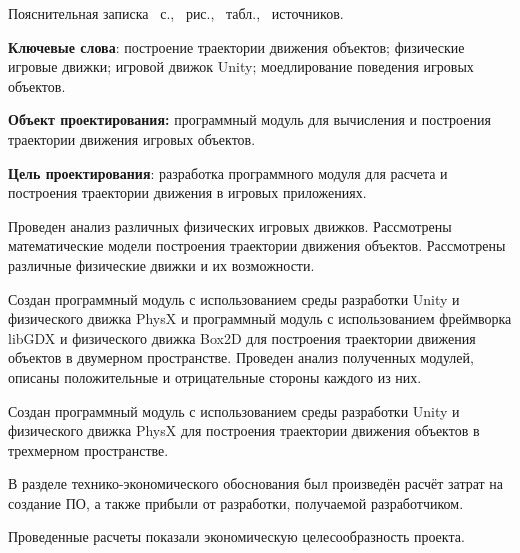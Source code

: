 \thispagestyle{empty}

\begin{center}
Пояснительная записка \pageref*{LastPage}~с., \totfig{}~рис., \tottab{}~табл., \totref{}~источников.
\diplomabig	
\end{center}

\textbf{Ключевые слова}: построение траектории движения объектов; физические игровые движки; игровой движок Unity; моедлирование поведения игровых объектов.

\textbf{Объект проектирования:} программный модуль для вычисления и построения траектории движения игровых объектов.

\textbf{Цель проектирования}: разработка программного модуля для расчета и построения траектории движения в игровых приложениях.

Проведен анализ различных физических игровых движков. Рассмотрены математические модели построения траектории движения объектов. Рассмотрены различные физические движки и их возможности. 

Создан программный модуль с использованием среды разработки Unity и физического движка PhysX и программный модуль с использованием фреймворка libGDX и физического движка Box2D для построения траектории движения объектов в двумерном пространстве. Проведен анализ полученных модулей, описаны положительные и отрицательные стороны каждого из них. 

Создан программный модуль с использованием среды разработки Unity и физического движка PhysX для построения траектории движения объектов в трехмерном пространстве.

В разделе технико-экономического обоснования был произведён расчёт затрат на создание ПО, а также прибыли от разработки, получаемой разработчиком.

Проведенные расчеты показали экономическую целесообразность проекта.
\clearpage
